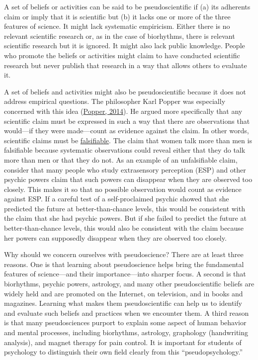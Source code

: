 \documentclass[
]{krantz}
\begin{document}
A set of beliefs or activities can be said to be pseudoscientific if (a) its adherents claim or imply that it is scientific but (b) it lacks one or more of the three features of science. It might lack systematic empiricism. Either there is no relevant scientific research or, as in the case of biorhythms, there is relevant scientific research but it is ignored. It might also lack public knowledge. People who promote the beliefs or activities might claim to have conducted scientific research but never publish that research in a way that allows others to evaluate it.

A set of beliefs and activities might also be pseudoscientific because it does not address empirical questions. The philosopher Karl Popper was especially concerned with this idea (\protect\hyperlink{ref-popper2014conjectures}{Popper, 2014}). He argued more specifically that any scientific claim must be expressed in such a way that there are observations that would---if they were made---count as evidence against the claim. In other words, scientific claims must be \protect\hyperlink{falsifiable}{falsifiable}. The claim that women talk more than men is falsifiable because systematic observations could reveal either that they do talk more than men or that they do not. As an example of an unfalsifiable claim, consider that many people who study extrasensory perception (ESP) and other psychic powers claim that such powers can disappear when they are observed too closely. This makes it so that no possible observation would count as evidence against ESP. If a careful test of a self-proclaimed psychic showed that she predicted the future at better-than-chance levels, this would be consistent with the claim that she had psychic powers. But if she failed to predict the future at better-than-chance levels, this would also be consistent with the claim because her powers can supposedly disappear when they are observed too closely.

Why should we concern ourselves with pseudoscience? There are at least three reasons. One is that learning about pseudoscience helps bring the fundamental features of science---and their importance---into sharper focus. A second is that biorhythms, psychic powers, astrology, and many other pseudoscientific beliefs are widely held and are promoted on the Internet, on television, and in books and magazines. Learning what makes them pseudoscientific can help us to identify and evaluate such beliefs and practices when we encounter them. A third reason is that many pseudosciences purport to explain some aspect of human behavior and mental processes, including biorhythms, astrology, graphology (handwriting analysis), and magnet therapy for pain control. It is important for students of psychology to distinguish their own field clearly from this ``pseudopsychology.''
\end{document}

